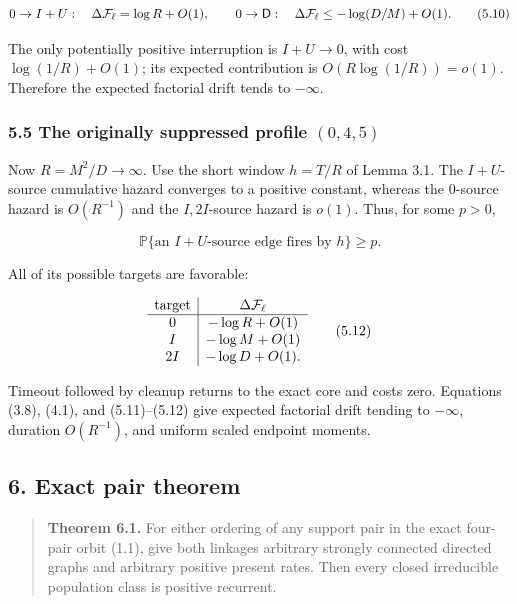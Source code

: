 \[
 0\to I+U:\quad \Delta{\cal F}_\ell=\log R+O(1),
\qquad
 0\to{\mathsf D}:\quad
 \Delta{\cal F}_\ell\le-\log(D/M)+O(1).                \tag{5.10}
\]

The only potentially positive interruption is \(I+U\to0\), with cost
\(\log(1/R)+O(1)\); its expected contribution is \(O(R\log(1/R))=o(1)\).
Therefore the expected factorial drift tends to \(-\infty\).

\subsubsection{\texorpdfstring{5.5 The originally suppressed profile
\((0,4,5)\)}{5.5 The originally suppressed profile (0,4,5)}}

Now \(R=M^2/D\to\infty\). Use the short window \(h=T/R\) of Lemma 3.1.
The \(I+U\)-source cumulative hazard converges to a positive constant,
whereas the \(0\)-source hazard is \(O(R^{-1})\) and the \(I,2I\)-source
hazard is \(o(1)\). Thus, for some \(p>0\),

\[
 {\mathbb P}\{\text{an }I+U\text{-source edge fires by }h\}\ge p. \tag{5.11}
\]

All of its possible targets are favorable:

\[
\begin{array}{c|c}
\text{target}&\Delta{\cal F}_\ell\\ \hline
0&-\log R+O(1)\\
I&-\log M+O(1)\\
2I&-\log D+O(1).
\end{array}                                            \tag{5.12}
\]

Timeout followed by cleanup returns to the exact core and costs zero.
Equations (3.8), (4.1), and (5.11)--(5.12) give expected factorial drift
tending to \(-\infty\), duration \(O(R^{-1})\), and uniform scaled
endpoint moments.

\subsection{6. Exact pair theorem}

\begin{quote}
\textbf{Theorem 6.1.} For either ordering of any support pair in the
exact four-pair orbit (1.1), give both linkages arbitrary strongly
connected directed graphs and arbitrary positive present rates. Then
every closed irreducible population class is positive recurrent.
\end{quote}

